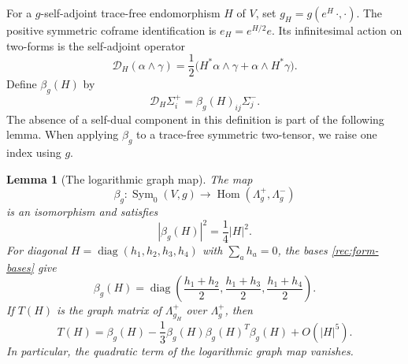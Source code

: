 \documentclass[11pt]{article}
\numberwithin{equation}{section}
\newtheorem{lemma}[theorem]{Lemma}
\theoremstyle{definition}
\theoremstyle{remark}
\begin{document}
For a $g$-self-adjoint trace-free endomorphism $H$ of $V$, set
$g_H=g(e^H\,\cdot,\cdot)$.  The positive symmetric coframe
identification is $e_H=e^{H/2}e$.  Its infinitesimal action on two-forms is
the self-adjoint operator
\begin{equation}
 \mathscr D_H(\alpha\wedge\gamma)
   =\frac12\bigl(H^*\alpha\wedge\gamma
                         +\alpha\wedge H^*\gamma\bigr).
 \label{rec:D-H}
\end{equation}
Define $\beta_g(H)$ by
\begin{equation}
 \mathscr D_H\Sigma_i^+=\beta_g(H)_{ij}\Sigma_j^-.
 \label{rec:beta-definition}
\end{equation}
The absence of a self-dual component in this definition is part of the
following lemma.  When applying $\beta_g$ to a trace-free symmetric
two-tensor, we raise one index using $g$.

\begin{lemma}[The logarithmic graph map]
\label{rec:graph-lemma}
The map
\[
 \beta_g:\operatorname{Sym}_0(V,g)\longrightarrow
                  \operatorname{Hom}(\Lambda_g^+,\Lambda_g^-)
\]
is an isomorphism and satisfies
\begin{equation}
 |\beta_g(H)|^2=\frac14|H|^2.
 \label{rec:beta-norm}
\end{equation}
For diagonal $H=\operatorname{diag}(h_1,h_2,h_3,h_4)$ with
$\sum_a h_a=0$, the bases \eqref{rec:form-bases} give
\begin{equation}
 \beta_g(H)=\operatorname{diag}
 \left(\frac{h_1+h_2}{2},\frac{h_1+h_3}{2},
                         \frac{h_1+h_4}{2}\right).
 \label{rec:beta-diagonal}
\end{equation}
If $T(H)$ is the graph matrix of $\Lambda_{g_H}^+$ over
$\Lambda_g^+$, then
\begin{equation}
 T(H)=\beta_g(H)-\frac13\beta_g(H)\beta_g(H)^T\beta_g(H)
                         +O(|H|^5).
 \label{rec:graph-cubic}
\end{equation}
In particular, the quadratic term of the logarithmic graph map vanishes.
\end{lemma}
\end{document}
